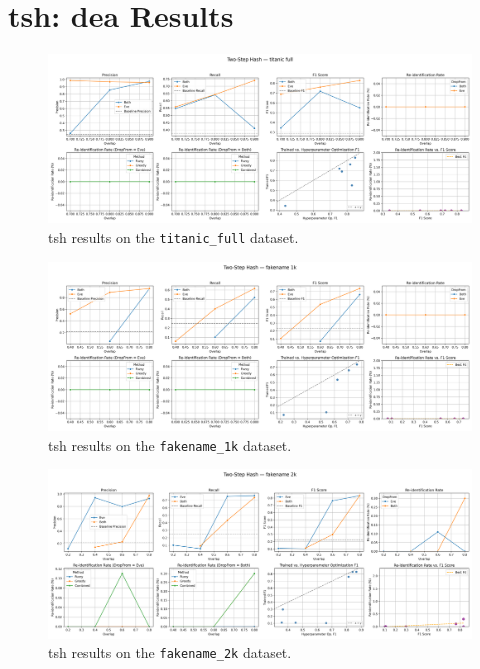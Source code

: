\clearpage

\section{\ac{tsh}: \ac{dea} Results} \label{sec:twostep_results}

\begin{figure}[H]
    \centering
    \includegraphics[width=\textwidth]{figures/TwoStepHash_titanic_full_metrics.png}
    \caption{\ac{tsh} results on the \texttt{titanic\_full} dataset.}
    \label{fig:twostep_titanic}
\end{figure}

\begin{figure}[H]
    \centering
    \includegraphics[width=\textwidth]{figures/TwoStepHash_fakename_1k_metrics.png}
    \caption{\ac{tsh} results on the \texttt{fakename\_1k} dataset.}
    \label{fig:twostep_fakename1k}
\end{figure}

\begin{figure}[H]
    \centering
    \includegraphics[width=\textwidth]{figures/TwoStepHash_fakename_2k_metrics.png}
    \caption{\ac{tsh} results on the \texttt{fakename\_2k} dataset.}
    \label{fig:twostep_fakename2k}
\end{figure}


